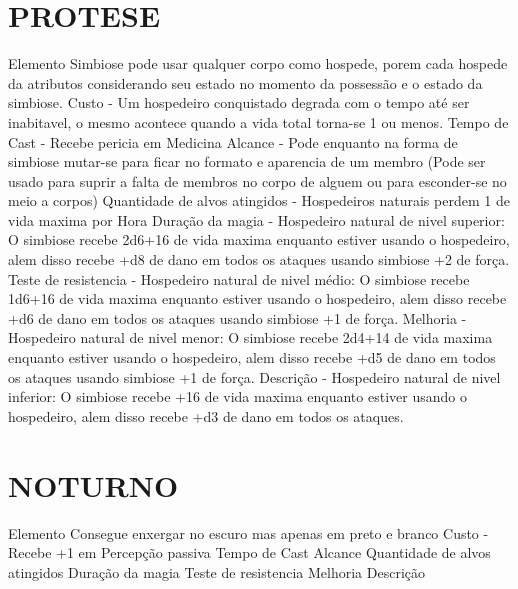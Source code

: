 \documentclass{article}%
\begin{document}
\section{PROTESE}%
\label{sec:PROTESE}%
Elemento Simbiose pode usar qualquer corpo como hospede, porem cada hospede da atributos considerando seu estado no momento da possessão e o estado da simbiose.\newline%
Custo {-} Um hospedeiro conquistado degrada com o tempo até ser inabitavel, o mesmo acontece quando a vida total torna{-}se 1 ou menos.\newline%
Tempo de Cast {-} Recebe pericia em Medicina\newline%
Alcance {-} Pode enquanto na forma de simbiose mutar{-}se para ficar no formato e aparencia de um membro (Pode ser usado para suprir a falta de membros no corpo de alguem ou para esconder{-}se no meio a corpos)\newline%
Quantidade de alvos atingidos {-} Hospedeiros naturais perdem 1 de vida maxima por Hora\newline%
Duração da magia {-} Hospedeiro natural de nivel superior: O simbiose recebe 2d6+16 de vida maxima enquanto estiver usando o hospedeiro, alem disso recebe +d8 de dano em todos os ataques usando simbiose +2 de força.\newline%
Teste de resistencia {-} Hospedeiro natural de nivel médio: O simbiose recebe 1d6+16 de vida maxima enquanto estiver usando o hospedeiro, alem disso recebe +d6 de dano em todos os ataques usando simbiose +1 de força.\newline%
Melhoria {-} Hospedeiro natural de nivel menor: O simbiose recebe 2d4+14 de vida maxima enquanto estiver usando o hospedeiro, alem disso recebe +d5 de dano em todos os ataques usando simbiose +1 de força.\newline%
Descrição {-} Hospedeiro natural de nivel inferior: O simbiose recebe +16 de vida maxima enquanto estiver usando o hospedeiro, alem disso recebe +d3 de dano em todos os ataques.\newline%

%
\section{NOTURNO}%
\label{sec:NOTURNO}%
Elemento Consegue enxergar no escuro mas apenas em preto e branco\newline%
Custo {-} Recebe +1 em Percepção passiva\newline%
Tempo de Cast \newline%
Alcance \newline%
Quantidade de alvos atingidos \newline%
Duração da magia \newline%
Teste de resistencia \newline%
Melhoria \newline%
Descrição \newline%
\end{document}
